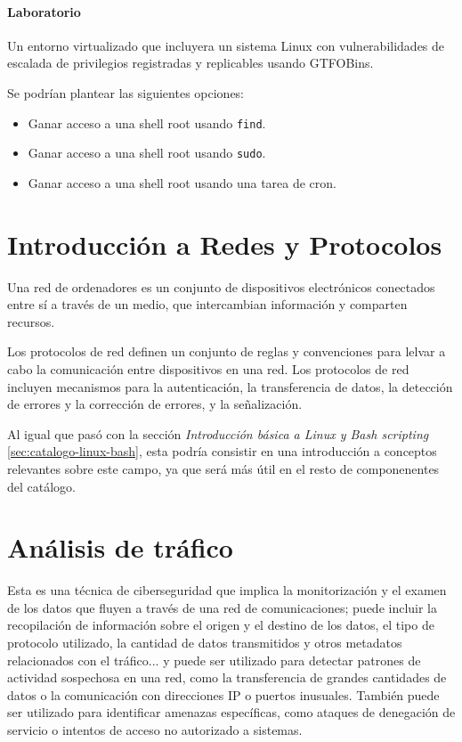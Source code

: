         \paragraph{Laboratorio}

            Un entorno virtualizado que incluyera un sistema Linux con vulnerabilidades de escalada de privilegios registradas y replicables usando GTFOBins.

            Se podrían plantear las siguientes opciones:
            
            \begin{itemize}
                \item Ganar acceso a una shell root usando \texttt{find}.
                \item Ganar acceso a una shell root usando \texttt{sudo}.
                \item Ganar acceso a una shell root usando una tarea de cron.
            \end{itemize}

    
    \section{Introducción a Redes y Protocolos}

        Una red de ordenadores es un conjunto de dispositivos electrónicos conectados entre sí a través de un medio, que intercambian información y comparten recursos.
        
        Los protocolos de red definen un conjunto de reglas y convenciones para lelvar a cabo la comunicación entre dispositivos en una red. Los protocolos de red incluyen mecanismos para la autenticación, la transferencia de datos, la detección de errores y la corrección de errores, y la señalización.

        Al igual que pasó con la sección \textit{Introducción básica a Linux y Bash scripting} \ref{sec:catalogo-linux-bash}, esta podría consistir en una introducción a conceptos relevantes sobre este campo, ya que será más útil en el resto de componenentes del catálogo.

        
    \section{Análisis de tráfico}
        
        Esta es una técnica de ciberseguridad que implica la monitorización y el examen de los datos que fluyen a través de una red de comunicaciones; puede incluir la recopilación de información sobre el origen y el destino de los datos, el tipo de protocolo utilizado, la cantidad de datos transmitidos y otros metadatos relacionados con el tráfico... y puede ser utilizado para detectar patrones de actividad sospechosa en una red, como la transferencia de grandes cantidades de datos o la comunicación con direcciones IP o puertos inusuales. También puede ser utilizado para identificar amenazas específicas, como ataques de denegación de servicio o intentos de acceso no autorizado a sistemas.
        
